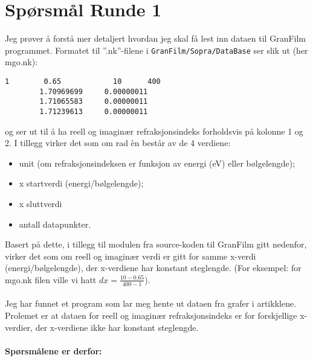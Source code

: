\section{Spørsmål Runde 1 }
Jeg prøver å forstå mer detaljert hvordan jeg skal få lest inn dataen til GranFilm programmet.
Formatet til ''.nk''-filene i \texttt{GranFilm/Sopra/DataBase} ser slik ut (her mgo.nk):
\begin{lstlisting}[style=FormattedNumber,frame=none]
   1		0.65			10		400    
        1.70969699     0.00000011
        1.71065583     0.00000011
        1.71239613     0.00000011
\end{lstlisting}
og ser ut til å ha reell og imaginær refraksjonsindeks forholdsvis på kolonne 1 og 2. I tillegg virker det
som om rad èn består av de 4 verdiene: 
\begin{itemize}
   \item unit (om refraksjonsindeksen er funksjon av energi (eV) 
eller bølgelengde); 
\item x startverdi (energi/bølgelengde); 
\item x sluttverdi
\item antall datapunkter.
\end{itemize}
Basert på dette, i tillegg til modulen fra source-koden til GranFilm gitt nedenfor, virker det
som om reell og imaginær verdi er gitt for samme x-verdi (energi/bølgelengde), der x-verdiene 
har konstant steglengde. (For eksempel: for mgo.nk filen ville vi hatt $d\!x = \frac{10-0.65}{400-1}$).
\\
\\
Jeg har funnet et program som lar meg hente ut dataen fra grafer i artikklene. 
Prolemet er at dataen for reell og imaginær refraksjonsindeks 
er for forskjellige x-verdier, der x-verdiene ikke har
konstant steglengde.\\
\\
\textbf{Spørsmålene er derfor:} 

